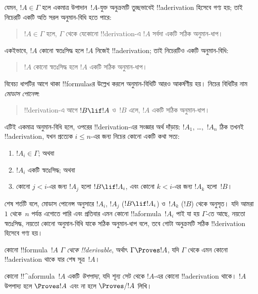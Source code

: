 \documentclass[../../../include/open-logic-section]{subfiles}
\begin{document}
যেমন, $!A \in \Gamma$ হলে একমাত্র উপাদান~$!A$-যুক্ত অনুক্রমটি
তুচ্ছভাবেই !!a{derivation} হিসেবে গণ্য হয়; তাই নিচেরটি একটি অতি সরল
অনুমান-বিধি হতে পারে:
\begin{quote}
  $!A \in \Gamma$ হলে, $\Gamma$ থেকে যেকোনো !!{derivation}-এ $!A$
  সর্বদা একটি সঠিক অনুমান-ধাপ।
\end{quote}
একইভাবে, $!A$ কোনো স্বতঃসিদ্ধ হলে $!A$ নিজেই !!a{derivation}; তাই
নিচেরটিও একটি অনুমান-বিধি:
\begin{quote}
  $!A$ কোনো স্বতঃসিদ্ধ হলে $!A$ একটি সঠিক অনুমান-ধাপ।
\end{quote}
বিবেচ্য ধাপটির আগে থাকা !!{formula}sর উল্লেখ করলে অনুমান-বিধিটি
আরও আকর্ষণীয় হয়। নিচের বিধিটির নাম \emph{মোডাস পোনেন্স}:
\begin{quote}
  !!{derivation}-এ আগে $!B \lif !A$ ও~$!B$ এলে, $!A$ একটি সঠিক
  অনুমান-ধাপ।
\end{quote}
এটিই একমাত্র অনুমান-বিধি হলে, ওপরের !!{derivation}-এর সংজ্ঞার অর্থ
দাঁড়ায়: $!A_1$, \dots,~$!A_n$ ঠিক তখনই !!a{derivation}, যখন
প্রত্যেক $i \le n$-এর জন্য নিচের কোনো একটি কথা সত্য:
\begin{enumerate}
\item $!A_i \in \Gamma$; অথবা
\item $!A_i$ একটি স্বতঃসিদ্ধ; অথবা
\item কোনো $j < i$-এর জন্য $!A_j$ হলো $!B \lif !A_i$, এবং কোনো
  $k < i$-এর জন্য $!A_k$ হলো~$!B$।
\end{enumerate}
শেষ শর্তটি বলে, মোডাস পোনেন্স অনুসারে $!A_i$, $!A_j$ ($!B \lif
!A_i$) ও~$!A_k$ ($!B$) থেকে অনুসৃত। যদি আমরা $1$ থেকে~$n$ পর্যন্ত
এগোতে পারি এবং প্রতিবার এমন কোনো !!a{formula}~$!A_i$ পাই যা হয়
$\Gamma$-তে আছে, নয়তো স্বতঃসিদ্ধ, নয়তো কোনো অনুমান-বিধি যাকে সঠিক
অনুমান-ধাপ বলে, তবে গোটা অনুক্রমটি সঠিক !!{derivation} হিসেবে গণ্য হয়।

\begin{defn}[!!^{derivability}]
কোনো !!{formula}~$!A$ $\Gamma$ \emph{থেকে !!{derivable}}, অর্থাৎ
$\Gamma \Proves !A$, যদি $\Gamma$ থেকে এমন কোনো !!a{derivation}
থাকে যার শেষ সূত্র~$!A$।
\end{defn}

\begin{defn}[উপপাদ্য]
কোনো !!^a{formula}~$!A$ একটি \emph{উপপাদ্য}, যদি শূন্য সেট থেকে
$!A$-এর কোনো !!a{derivation} থাকে। $!A$ উপপাদ্য হলে $\Proves !A$
এবং না হলে $\Proves/ !A$ লিখি।
\end{defn}
\end{document}
